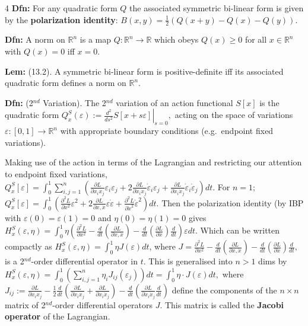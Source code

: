 \documentclass[landscape, 8pt]{extarticle}
\begin{document}
\begin{multicols*}{4}
		\textbf{Dfn:} For any quadratic form $Q$ the associated symmetric bi-linear form is given by the \textbf{polarization identity}:
		$
		B(x,y)=\frac{1}{2}(Q(x+y)-Q(x)-Q(y)).
		$
		
		\textbf{Dfn:} A norm on $\mathbb{R}^n$ is a map $Q:\mathbb{R}^n\to\mathbb{R}$ which obeys $Q(x)\geq 0$ for all $x\in\mathbb{R}^n$ with $Q(x)=0$ iff $x=0$.
		
		\textbf{Lem:} (13.2). A symmetric bi-linear form is positive-definite iff its associated quadratic form defines a norm on $\mathbb{R}^n$.
		
		\textbf{Dfn:} (2$^{nd}$ Variation). The 2$^{nd}$ variation of an action functional $S[x]$ is the quadratic form
		$
		Q^S_x(\varepsilon):=\left.\frac{d^2}{ds^2}S[x+s\varepsilon]\right|_{s=0},
		$
		acting on the space of variations $\varepsilon:[0,1]\to\mathbb{R}^n$ with appropriate boundary conditions (e.g.\ endpoint fixed variations).
		
		Making use of the action in terms of the Lagrangian and restricting our attention to endpoint fixed variations,
		$
		Q^S_x[\varepsilon]=\int_0^1\sum_{i,j=1}^n\left(\frac{\partial L}{\partial x_i x_j}\varepsilon_i\varepsilon_j+2\frac{\partial L}{\partial\dot{x}_i x_j}\dot\varepsilon_i\varepsilon_j+\frac{\partial L}{\partial\dot{x}_i\dot{x}_j}\dot\varepsilon_i\dot\varepsilon_j\right)dt.
		$
		For $n=1$;
		$
		Q^S_x[\varepsilon]=\int_0^1\left(\frac{\partial^2 L}{\partial x^2}\varepsilon^2+2\frac{\partial L}{\partial x,\dot{x}}\varepsilon\dot\varepsilon+\frac{\partial^2 L}{\partial\dot{x}^2}\dot\varepsilon^2\right)dt.
		$
		Then the polarization identity (by IBP with $\varepsilon(0)=\varepsilon(1)=0$ and $\eta(0)=\eta(1)=0$ gives
		$
		H^S_x(\varepsilon,\eta)=\int_0^1\eta\left(\frac{\partial^2 L}{\partial x^2}-\frac{d}{dt}\left(\frac{\partial L}{\partial x,\dot{x}}\right)-\frac{d}{dt}\left(\frac{\partial L}{\partial\dot{x}}\right)\frac{d}{dt}\right)\varepsilon dt.
		$
		Which can be written compactly as $H^S_x(\varepsilon,\eta)=\int_0^1\eta J(\varepsilon)dt$, where
		$
		J=\frac{\partial^2 L}{\partial x^2}-\frac{d}{dt}\left(\frac{\partial L}{\partial x,\dot{x}}\right)-\frac{d}{dt}\left(\frac{\partial L}{\partial\dot{x}}\right)\frac{d}{dt},
		$
		is a 2$^{nd}$-order differential operator in $t$. This is generalised into $n>1$ dims by
		$
		H^S_x(\varepsilon,\eta)=\int_0^1\left(\sum_{i,j=1}^n\eta_i J_{ij}(\varepsilon_j)\right)dt=\int_0^1\eta\cdot J(\varepsilon)dt,
		$
		where
		$
		J_{ij}:=\frac{\partial L}{\partial x_i x_j}-\frac{1}{2}\frac{d}{dt}\left(\frac{\partial L}{\partial\dot{x}_i x_j}+\frac{\partial L}{\partial x_i\dot{x}_j}\right)-\frac{d}{dt}\left(\frac{\partial L}{\partial\dot{x}_i\dot{x}_j}\frac{d}{dt}\right)
		$
		define the components of the $n\times n$ matrix of 2$^{nd}$-order differential operators $J$. This matrix is called the \textbf{Jacobi operator} of the Lagrangian.
		

\end{multicols*}
\end{document}

